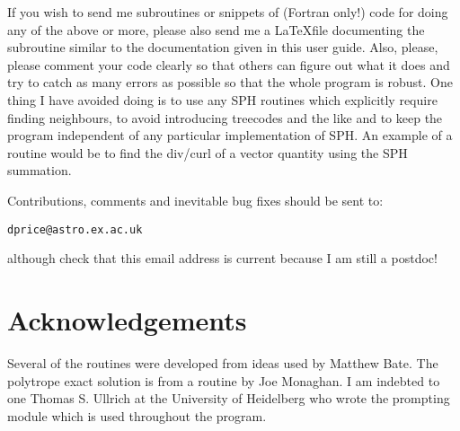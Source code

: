 \documentclass[a4paper,11pt]{article}
\begin{document}
If you wish to send me subroutines or snippets of (Fortran only!) code for doing any of the above or
more, please also send me a \LaTeX file
documenting the subroutine similar to the documentation given in this user guide.
Also, please, please comment your code clearly so that others can figure out
what it does and try to catch as many errors as possible so that the whole
program is robust.  One thing I have avoided doing is to use any SPH
routines which explicitly require finding neighbours, to avoid introducing treecodes and
the like and to keep the program independent of any particular implementation of
SPH. An example of a
routine would be to find the div/curl of a vector quantity using
the SPH summation.

Contributions, comments and inevitable bug fixes
should be sent to:
\begin{verbatim}
dprice@astro.ex.ac.uk
\end{verbatim}
although check that this email address is current because I am still a postdoc!

\section*{Acknowledgements}
 Several of the routines were developed from ideas used by Matthew Bate. The
polytrope exact solution is from a routine by Joe Monaghan. I am indebted to one
Thomas S. Ullrich at the University of Heidelberg who wrote the prompting module
which is used throughout the program.

\newpage
\appendix
\end{document}

